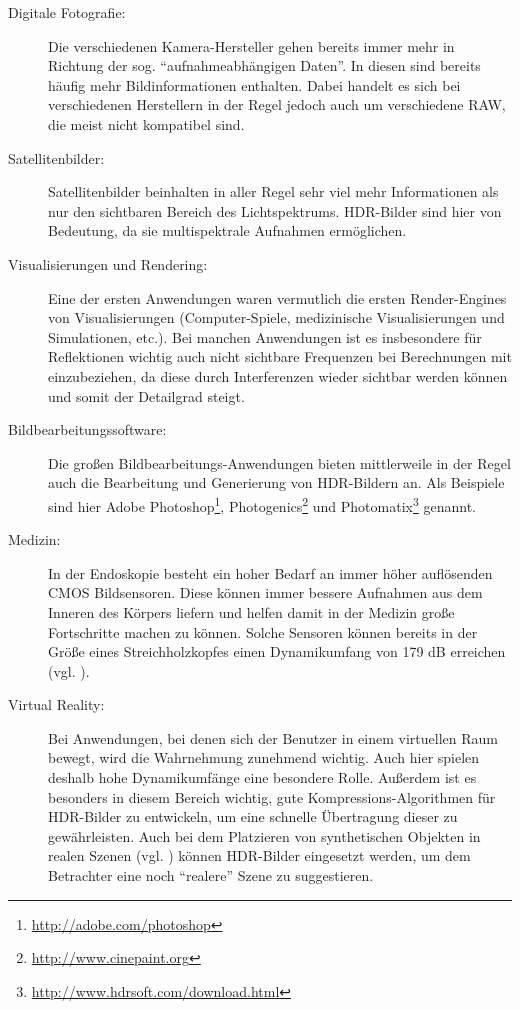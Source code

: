 \begin{description}

\item[Digitale Fotografie:] Die verschiedenen Kamera-Hersteller gehen bereits immer mehr in Richtung der sog.  \enquote{aufnahmeabhängigen Daten}. In diesen sind bereits häufig mehr Bildinformationen enthalten. Dabei handelt es sich bei verschiedenen Herstellern in der Regel jedoch auch um verschiedene \acrfull{RAW}, die meist nicht kompatibel sind. 

\item[Satellitenbilder:] Satellitenbilder beinhalten in aller Regel sehr viel mehr Informationen als nur den sichtbaren Bereich des Lichtspektrums. \gls{HDR}-Bilder sind hier von Bedeutung, da sie multispektrale Aufnahmen ermöglichen.

\item[Visualisierungen und Rendering:] Eine der ersten Anwendungen waren vermutlich die ersten Render-Engines von Visualisierungen (Computer-Spiele, medizinische Visualisierungen und Simulationen, etc.). Bei manchen Anwendungen ist es insbesondere für Reflektionen wichtig auch nicht sichtbare Frequenzen bei Berechnungen mit einzubeziehen, da diese durch Interferenzen wieder sichtbar werden können und somit der Detailgrad steigt.

\item[Bildbearbeitungssoftware:] Die großen Bildbearbeitungs-Anwendungen bieten mittlerweile in der Regel auch die Bearbeitung und Generierung von \gls{HDR}-Bildern an. Als Beispiele sind hier Adobe Photoshop\footnote{\url{http://adobe.com/photoshop}}, Photogenics\footnote{\url{http://www.cinepaint.org}} und Photomatix\footnote{\url{http://www.hdrsoft.com/download.html}} genannt.

\item[Medizin:] In der Endoskopie besteht ein hoher Bedarf an immer höher auflösenden \gls{CMOS} Bildsensoren. Diese können immer bessere Aufnahmen aus dem Inneren des Körpers liefern und helfen damit in der Medizin große Fortschritte machen zu können. Solche Sensoren können bereits in der Größe eines Streichholzkopfes einen Dynamikumfang von 179 dB erreichen (vgl. \cite{Klingler_Richter_Strobel_2006}).

\item[Virtual Reality:] Bei Anwendungen, bei denen sich der Benutzer in einem virtuellen Raum bewegt, wird die Wahrnehmung zunehmend wichtig. Auch hier spielen deshalb hohe Dynamikumfänge eine besondere Rolle. Außerdem ist es besonders in diesem Bereich wichtig, gute Kompressions-Algorithmen für \gls{HDR}-Bilder zu entwickeln, um eine schnelle Übertragung dieser zu gewährleisten. Auch bei dem Platzieren von synthetischen Objekten in realen Szenen (vgl. \cite{Debevec:2008:RSO:1401132.1401175}) können \gls{HDR}-Bilder eingesetzt werden, um dem Betrachter eine noch \enquote{realere} Szene zu suggestieren.
\end{description}


